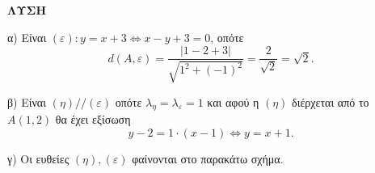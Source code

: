 \textbf{ΛΥΣΗ}

α) Είναι $(\varepsilon): y = x+3 \Leftrightarrow x - y + 3 = 0$, οπότε
\[ d(A,\varepsilon) = \frac{|1-2+3|}{\sqrt{1^2 + (-1)^2}} = \frac{2}{\sqrt{2}} = \sqrt{2}. \]

β) Είναι $(\eta) // (\varepsilon)$ οπότε $\lambda_\eta = \lambda_\varepsilon = 1$ και αφού η $(\eta)$ διέρχεται από το $A(1,2)$ θα έχει εξίσωση
\[ y-2 = 1 \cdot (x-1) \Leftrightarrow y = x+1. \]

γ) Οι ευθείες $(\eta), (\varepsilon)$ φαίνονται στο παρακάτω σχήμα.
